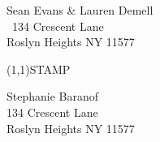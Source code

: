\documentclass[12pt]{article}
\begin{document}
\begin{minipage}{.5\linewidth} \noindent
Sean Evans \& Lauren Demell\\\ 
134 Crescent Lane\\ 
Roslyn Heights NY 11577
\end{minipage}
\begin{minipage}{.5\linewidth \hspace{-.2in} \vspace{-.3in}}
\begin{flushright}
\framebox(1,1){STAMP}
\end{flushright}
\end{minipage}

\begin{center} \begin{Huge} \vspace*{\fill}
Stephanie Baranof\\
134 Crescent Lane\\
Roslyn Heights NY 11577\\
\vspace{\fill} \end{Huge} \end{center}

\clearpage
\end{document}
